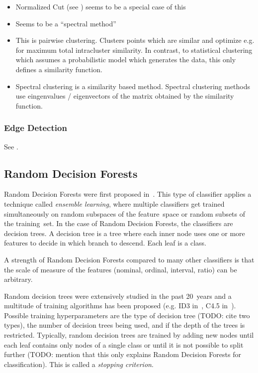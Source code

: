 \begin{itemize}
    \item Normalized Cut (see \cite{shi2000normalized}) seems to be a special
          case of this
    \item Seems to be a \enquote{spectral method}
    \item This is pairwise clustering. Clusters points which are similar and
          optimize e.g. for maximum total intracluster similarity. In contrast,
          to statistical clustering which assumes a probabilistic model which
          generates the data, this only defines a similarity function.
    \item Spectral clustering is a similarity based method. Spectral clustering
          methods use eingenvalues / eigenvectors of the matrix obtained by the
          similarity function.
\end{itemize}


\subsubsection{Edge Detection}

See \cite{kass1988snakes}.


\subsection{Random Decision Forests}\label{subsec:random-forests}
Random Decision Forests were first proposed in~\cite{ho1995random}. This type
of classifier applies a technique called \textit{ensemble learning}, where
multiple classifiers get trained simultaneously on random subspaces of the
feature~space or random subsets of the training~set. In the case of Random
Decision Forests, the classifiers are decision trees. A decision tree is a tree
where each inner node uses one or more features to decide in which branch to
descend. Each leaf is a class.

A strength of Random Decision Forests compared to many other classifiers is
that the scale of measure of the features (nominal, ordinal, interval, ratio)
can be arbitrary.

Random decision trees were extensively studied in the past 20~years and a
multitude of training algorithms has been proposed (e.g. ID3
in~\cite{quinlan1986induction}, C4.5 in~\cite{quinlan2014c4}). Possible
training hyperparameters are the type of decision tree (TODO: cite two types),
the number of decision trees being used, and if the depth of the trees is
restricted. Typically, random decision trees are trained by adding new nodes
until each leaf contains only nodes of a single class or until it is not
possible to split further (TODO: mention that this only explains Random
Decision Forests for classification). This is called a
\textit{stopping criterion}.

